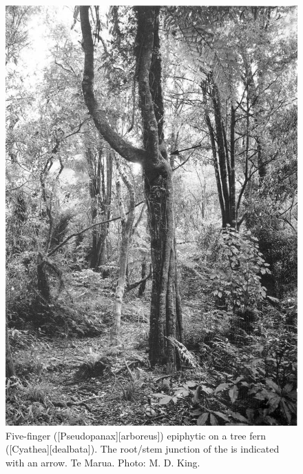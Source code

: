 \begin{figure}[htb]
	\centering
	\begin{minipage}[t]{0.505\textwidth}
		\centering
		\includegraphics[width=\textwidth]{graphics/figure55fivefinger.jpg}
    	\caption[Five-finger epiphytic on a tree fern]{Five-finger ([Pseudopanax][arboreus]) epiphytic on a tree fern ([Cyathea][dealbata]). The root/stem junction of the  is indicated with an arrow. Te Marua. Photo:  M. D. King.}%
    	\label{fig:55fivefinger}
	\end{minipage}\hfill%
	\begin{minipage}[t]{0.475\textwidth}
    	\centering

\end{minipage}
\end{figure}
